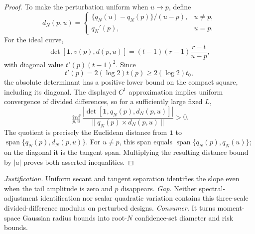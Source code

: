 \documentclass{article}
\begin{document}
\begin{proof}
To make the perturbation uniform when \(u\to p\), define
\[
 d_N(p,u)=
 \begin{cases}
 \{q_N(u)-q_N(p)\}/(u-p),&u\ne p,\\
 q_N'(p),&u=p.
 \end{cases}
\]
For the ideal curve,
\[
 \det[\mathbf 1,v(p),d(p,u)]
 =(t-1)(r-1)\frac{r-t}{u-p},
\]
with diagonal value \(t'(p)(t-1)^2\).  Since
\[
 t'(p)=2(\log 2)t(p)\ge 2(\log2)t_0,
\]
the absolute determinant has a positive lower bound on the compact square, including its diagonal.  The displayed \(C^1\) approximation implies uniform convergence of divided differences, so for a sufficiently large fixed \(L\),
\[
 \inf_{p,u}
 \frac{|\det[\mathbf 1,q_N(p),d_N(p,u)]|}
      {\|q_N(p)\times d_N(p,u)\|}>0.
\]
The quotient is precisely the Euclidean distance from \(\mathbf 1\) to \(\operatorname{span}\{q_N(p),d_N(p,u)\}\).  For \(u\ne p\), this span equals \(\operatorname{span}\{q_N(p),q_N(u)\}\); on the diagonal it is the tangent span.  Multiplying the resulting distance bound by \(|a|\) proves both asserted inequalities.
\end{proof}
\par\smallskip\noindent \textit{Justification.} Uniform secant and tangent separation identifies the slope even when the tail amplitude is zero and \(p\) disappears. \textit{Gap.} Neither spectral-adjustment identification nor scalar quadratic variation contains this three-scale divided-difference modulus on perturbed designs. \textit{Consumer.} It turns moment-space Gaussian radius bounds into root-\(N\) confidence-set diameter and risk bounds.
\end{document}
